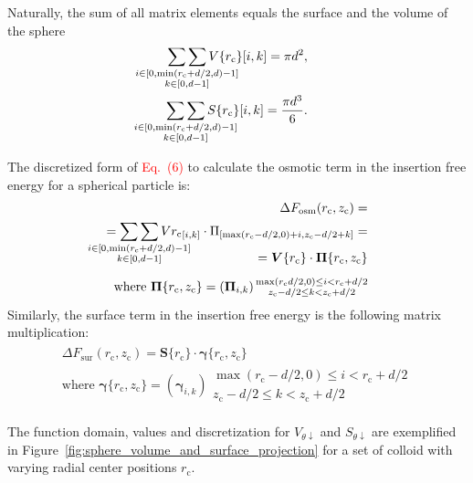 \documentclass[10pt, a4paper, twocolumn]{article}
\newcommand\todo[1]{\textcolor{red}{#1}}
\begin{document}
Naturally, the sum of all matrix elements equals the surface and the volume of the sphere
\begin{eqnarray*}
    \mathop{\sum\sum}_{\mathclap{\substack{i \in [0, \min(r_{\text{c}}+d/2,d)-1] \\ k \in [0, d-1]}}}  V\{r_{\text{c}}\}{[i, k]} = \pi d^2,
    \\
    \mathop{\sum\sum}_{\mathclap{\substack{i \in [0, \min(r_{\text{c}}+d/2,d)-1] \\ k \in [0, d-1]}}}  S\{r_{\text{c}}\}{[i, k]} = \frac{\pi d^3}{6} .
\end{eqnarray*}

The discretized form of \todo{Eq.~(6)} to calculate the osmotic term in the insertion free energy for a spherical particle is:
\begin{eqnarray}
    \begin{aligned}
        \Delta F_{\text{osm}}(r_{\text{c}}, z_{\text{c}}) =\\
        = \mathop{\sum\sum}_{\mathclap{\substack{i \in [0, \min(r_{\text{c}}+d/2,d)-1] \\ k \in [0, d-1]}}} V{r_{\text{c}}}_{[i, k]} \cdot \Pi_{[\max(r_{\text{c}}-d/2,0)+i, z_{\text{c}}-d/2+k]} =\\[-15pt]
        = \bm{V}\{r_{\text{c}}\} \cdot \bm{\Pi}\{r_{\text{c}}, z_{\text{c}}\} \\[5pt]
        \text{where } \bm{\Pi}\{r_{\text{c}},z_{\text{c}}\} =\left(\bm{\Pi}_{i,k}\right) {\substack{\max(r_{\text{c}}d/2,0) \le i < r_{\text{c}}+d/2 \\ z_{\text{c}}-d/2 \le k < z_{\text{c}}+d/2}}
    \end{aligned}
\end{eqnarray}
Similarly, the surface term in the insertion free energy is the following matrix multiplication:
\begin{eqnarray}
    \begin{aligned}
        \Delta F_{\text{sur}}(r_{\text{c}}, z_{\text{c}}) = \bm{S}\{r_{\text{c}}\} \cdot \bm{\gamma}\{r_{\text{c}}, z_{\text{c}}\} \\[5pt]
        \text{where } \bm{\gamma}\{r_{\text{c}},z_{\text{c}}\} =\left(\bm{\gamma}_{i,k}\right) {\substack{\max(r_{\text{c}}-d/2,0) \le i < r_{\text{c}}+d/2 \\ z_{\text{c}}-d/2 \le k < z_{\text{c}}+d/2}}
    \end{aligned}
\end{eqnarray}

The function domain, values and discretization for $V_{\theta \downarrow}$ and $S_{\theta \downarrow}$ are exemplified in Figure~\ref{fig:sphere_volume_and_surface_projection} for a set of colloid with varying radial center positions $r_{\text{c}}$.
\end{document}
